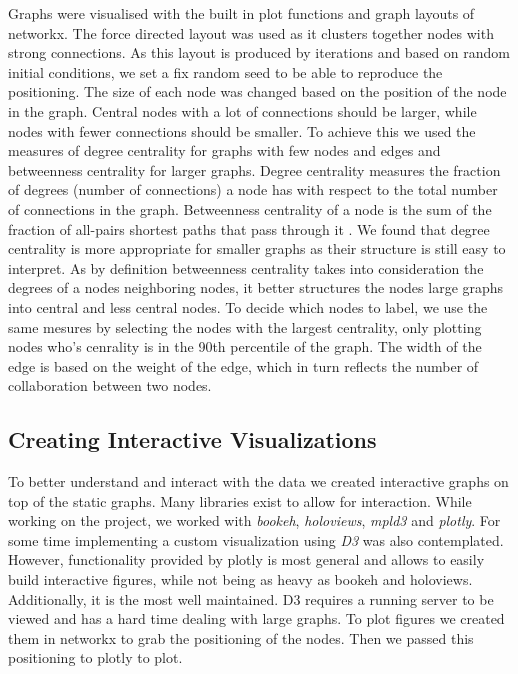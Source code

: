 \documentclass[article,twocolumn]{IEEEtran}
\begin{document}
Graphs were visualised with the built in plot functions and graph
layouts of networkx. The force directed layout was used as it clusters
together nodes with strong connections. As this layout is produced by
iterations and based on random initial conditions, we set a fix random
seed to be able to reproduce the positioning. The size of each node was
changed based on the position of the node in the graph. Central nodes
with a lot of connections should be larger, while nodes with fewer
connections should be smaller. To achieve this we used the measures of
degree centrality for graphs with few nodes and edges and betweenness
centrality for larger graphs. Degree centrality measures the fraction of
degrees (number of connections) a node has with respect to the total
number of connections in the graph. Betweenness centrality of a node is
the sum of the fraction of all-pairs shortest paths that pass through it
\cite{borgatti2014social}. We found that degree centrality is more
appropriate for smaller graphs as their structure is still easy to
interpret. As by definition betweenness centrality takes into
consideration the degrees of a nodes neighboring nodes, it better
structures the nodes large graphs into central and less central nodes.
To decide which nodes to label, we use the same mesures by selecting the
nodes with the largest centrality, only plotting nodes who's cenrality
is in the 90th percentile of the graph. The width of the edge is based
on the weight of the edge, which in turn reflects the number of
collaboration between two nodes.

    \hypertarget{creating-interactive-visualizations}{%
\subsection{Creating Interactive
Visualizations}\label{creating-interactive-visualizations}}

To better understand and interact with the data we created interactive
graphs on top of the static graphs. Many libraries exist to allow for
interaction. While working on the project, we worked with \emph{bookeh},
\emph{holoviews}, \emph{mpld3} and \emph{plotly}. For some time
implementing a custom visualization using \emph{D3} was also
contemplated. However, functionality provided by plotly is most general
and allows to easily build interactive figures, while not being as heavy
as bookeh and holoviews. Additionally, it is the most well maintained.
D3 requires a running server to be viewed and has a hard time dealing
with large graphs. To plot figures we created them in networkx to grab
the positioning of the nodes. Then we passed this positioning to plotly
to plot.
\end{document}
